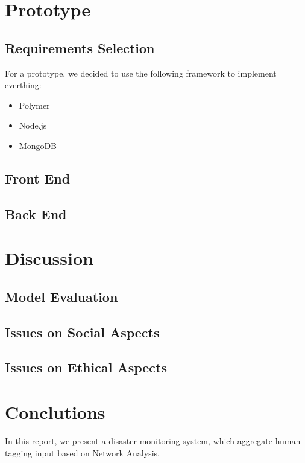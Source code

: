 \documentclass[paper=a4, fontsize=11pt]{scrartcl} %
\numberwithin{equation}{section} %
\numberwithin{figure}{section} %
\numberwithin{table}{section} %
\begin{document}
\section{Prototype}

  \subsection{Requirements Selection}
  For a prototype, we decided to use the following framework to implement everthing:

  \begin{itemize}
    \item Polymer
    \item Node.js
    \item MongoDB
  \end{itemize}
  \subsection{Front End}
  \subsection{Back End}

\section{Discussion}

  \subsection{Model Evaluation}
  \subsection{Issues on Social Aspects}
  \subsection{Issues on Ethical Aspects}

\section{Conclutions}

In this report, we present a disaster monitoring system, which aggregate human tagging input based on
Network Analysis. 

\nocite{*}


\end{document}
